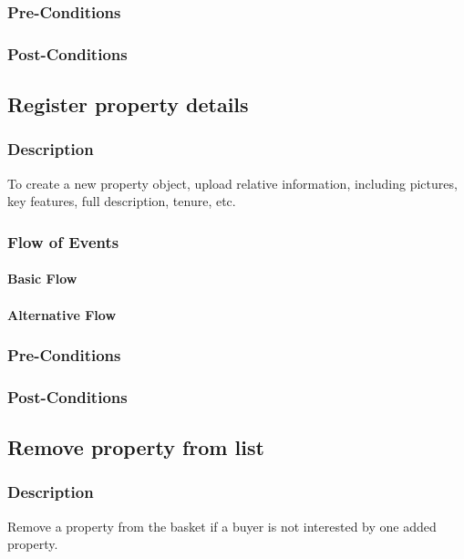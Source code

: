 \documentclass[a4paper,12pt]{article}
\begin{document}
\subsubsection{Pre-Conditions}
\subsubsection{Post-Conditions}

\subsection{Register property details}
\subsubsection{Description}
To create a new property object, upload relative information, including pictures, key features, full description, tenure, etc.
\subsubsection{Flow of Events}
\paragraph{Basic Flow}
\begin{itemize}
\end{itemize}

\paragraph{Alternative Flow}
\begin{itemize}
\end{itemize}

\subsubsection{Pre-Conditions}
\subsubsection{Post-Conditions}

\subsection{Remove property from list}
\subsubsection{Description}
Remove a property from the basket if a buyer is not interested by one added property.
\end{document}
